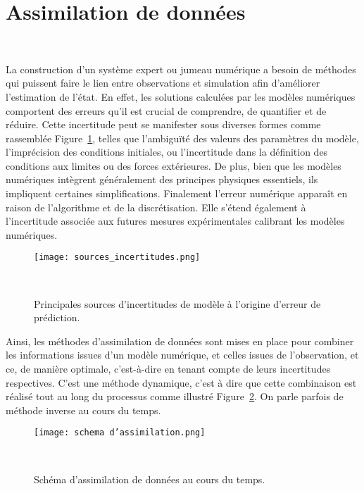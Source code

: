 
\section{Assimilation de données}~\label{sec:da}

La construction d'un système expert ou jumeau numérique a besoin de méthodes qui puissent faire le lien entre observations et simulation afin d'améliorer l'estimation de l'état. En effet, les solutions calculées par les modèles numériques comportent des erreurs qu'il est crucial de comprendre, de quantifier et de réduire. Cette incertitude peut se manifester sous diverses formes comme rassemblée Figure~\ref{fig:sources_erreur}, telles que l'ambiguïté des valeurs des paramètres du modèle, l'imprécision des conditions initiales, ou l'incertitude dans la définition des conditions aux limites ou des forces extérieures. De plus, bien que les modèles numériques intègrent généralement des principes physiques essentiels, ils impliquent certaines simplifications. Finalement l'erreur numérique apparaît en raison de l'algorithme et de la discrétisation. Elle s'étend également à l'incertitude associée aux futures mesures expérimentales calibrant les modèles numériques.

\begin{figure}[h]
    \centering
    \texttt{[image: sources\_incertitudes.png]}
    \caption{Principales sources d'incertitudes de modèle à l'origine d'erreur de prédiction.}~\label{fig:sources_erreur}
\end{figure}

Ainsi, les méthodes d'assimilation de données sont mises en place pour combiner les informations issues d'un modèle numérique, et celles issues de l'observation, et ce, de manière optimale, c'est-à-dire en tenant compte de leurs incertitudes respectives. C'est une méthode dynamique, c'est à dire que cette combinaison est réalisé tout au long du processus comme illustré Figure~\ref{fig:assim_da_scheme}. On parle parfois de méthode inverse au cours du temps.

\begin{figure}[h]
    \centering
    \texttt{[image: schema d'assimilation.png]}
    \caption{Schéma d'assimilation de données au cours du temps.}~\label{fig:assim_da_scheme}
\end{figure}

